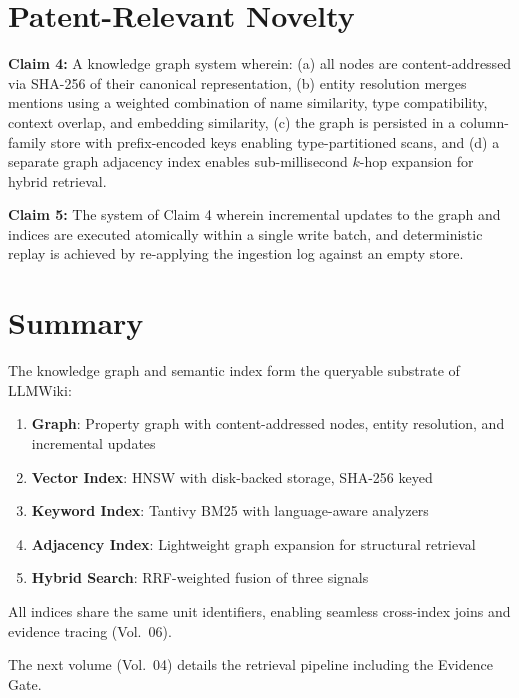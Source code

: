 \section{Patent-Relevant Novelty}
\label{sec:kg:patent}

\begin{patentclaim}
\textbf{Claim 4:} A knowledge graph system wherein: (a) all nodes are content-addressed via SHA-256 of their canonical representation, (b) entity resolution merges mentions using a weighted combination of name similarity, type compatibility, context overlap, and embedding similarity, (c) the graph is persisted in a column-family store with prefix-encoded keys enabling type-partitioned scans, and (d) a separate graph adjacency index enables sub-millisecond $k$-hop expansion for hybrid retrieval.
\end{patentclaim}

\begin{patentclaim}
\textbf{Claim 5:} The system of Claim 4 wherein incremental updates to the graph and indices are executed atomically within a single write batch, and deterministic replay is achieved by re-applying the ingestion log against an empty store.
\end{patentclaim}

\section{Summary}
\label{sec:kg:summary}

The knowledge graph and semantic index form the queryable substrate of LLMWiki:
\begin{enumerate}
  \item \textbf{Graph}: Property graph with content-addressed nodes, entity resolution, and incremental updates
  \item \textbf{Vector Index}: HNSW with disk-backed storage, SHA-256 keyed
  \item \textbf{Keyword Index}: Tantivy BM25 with language-aware analyzers
  \item \textbf{Adjacency Index}: Lightweight graph expansion for structural retrieval
  \item \textbf{Hybrid Search}: RRF-weighted fusion of three signals
\end{enumerate}
All indices share the same unit identifiers, enabling seamless cross-index joins and evidence tracing (Vol.~06).

The next volume (Vol.~04) details the retrieval pipeline including the Evidence Gate.

